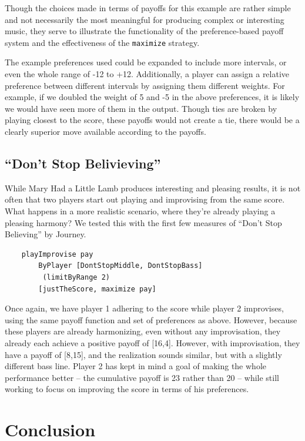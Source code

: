 \documentclass{article}
\begin{document}
Though the choices made in terms of payoffs for this example are rather
simple and not necessarily the most meaningful for producing complex or
interesting music, they serve to illustrate the functionality of the
preference-based payoff system and the effectiveness of the \texttt{maximize}
strategy.

The example preferences used could be expanded to include more intervals, or even
the whole range of -12 to +12.  Additionally, a player can assign a relative
preference between different intervals by assigning them different weights.  
For example, if we doubled the weight of 5 and -5 in
the above preferences, it is likely we would have seen more of them in the
output. Though ties are broken by playing closest to the score, these
payoffs would not create a tie, there would be a clearly superior move
available according to the payoffs.

\subsection{``Don't Stop Belivieving''}

While Mary Had a Little Lamb produces interesting and pleasing results,
it is not often that two players start out playing and improvising from
the same score. What happens in a more realistic scenario, where they're
already playing a pleasing harmony? We tested this with the first few
measures of ``Don't Stop Believing'' by Journey.

\begin{verbatim}
    playImprovise pay 
        ByPlayer [DontStopMiddle, DontStopBass]
         (limitByRange 2) 
        [justTheScore, maximize pay]
\end{verbatim}

Once again, we have player 1 adhering to the score while player 2
improvises, using the same payoff function and set of preferences as
above. However, because these players are already harmonizing, 
even without any improvisation, they already each achieve a positive payoff
of {[}16,4{]}.  However, with improvisation, they
have a payoff of {[}8,15{]}, and the realization sounds similar, but
with a slightly different bass line. Player 2 has kept in mind
a goal of making the whole performance better -- the cumulative payoff is 23
rather than 20 -- while still working to focus on improving the score in
terms of his preferences.

\section{Conclusion}
\end{document}
